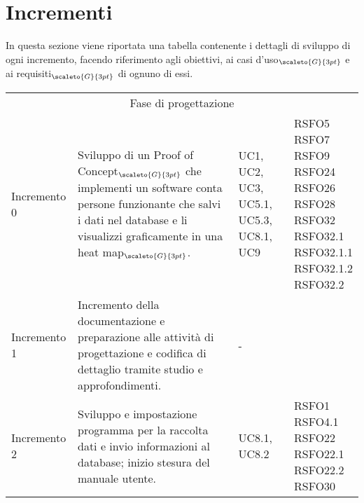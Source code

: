 \section{Incrementi}\label{ModelloDiSviluppoIncrementi}
In questa sezione viene riportata una tabella contenente i dettagli di sviluppo di ogni incremento, facendo riferimento agli obiettivi, ai casi d'uso$_{\scaleto{G}{3pt}}$ e ai requisiti$_{\scaleto{G}{3pt}}$ di ognuno di essi.
\begin{center}
	\renewcommand{\arraystretch}{1.4}
	\begin{longtable}[c]{p{4cm}|p{4cm}|p{4cm}|p{3cm}}
		\hline
		\rowcolor{airforceblue}
		\makecell[c]{\textbf{Incremento}} & \makecell[c]{\textbf{Obiettivi}} & \makecell[c]{\textbf{Casi d'uso}} &  \makecell[c]{\textbf{Requisiti}}\\
		\hline
		\multicolumn{4}{|c|}{Fase di progettazione}\\
		\hline
		\centering Incremento 0 & \centering Sviluppo di un
		Proof of Concept$_{\scaleto{G}{3pt}}$ che implementi un software conta persone funzionante che salvi i dati nel database e li visualizzi graficamente in una heat map$_{\scaleto{G}{3pt}}$. & \centering  UC1, UC2, UC3, UC5.1, UC5.3, UC8.1, UC9 & \makecell[c]{RSFO5 \\ RSFO7 \\ RSFO9 \\ RSFO24 \\ RSFO26 \\ RSFO28 \\ RSFO32 \\ RSFO32.1 \\ RSFO32.1.1 \\ RSFO32.1.2 \\ RSFO32.2} \\
		\hline
		\centering Incremento 1 & \centering Incremento della documentazione e preparazione alle attività di progettazione e codifica di dettaglio tramite studio e approfondimenti. & \centering - & \makecell[c]{-} \\
		\hline
		\centering Incremento 2 & \centering Sviluppo e impostazione programma per la raccolta dati e invio informazioni al database; inizio stesura del manuale utente. & \centering UC8.1, UC8.2 & \makecell[c]{RSFO1 \\ RSFO4.1 \\ RSFO22 \\ RSFO22.1 \\ RSFO22.2 \\ RSFO30} \\

\end{longtable}
\end{center}
